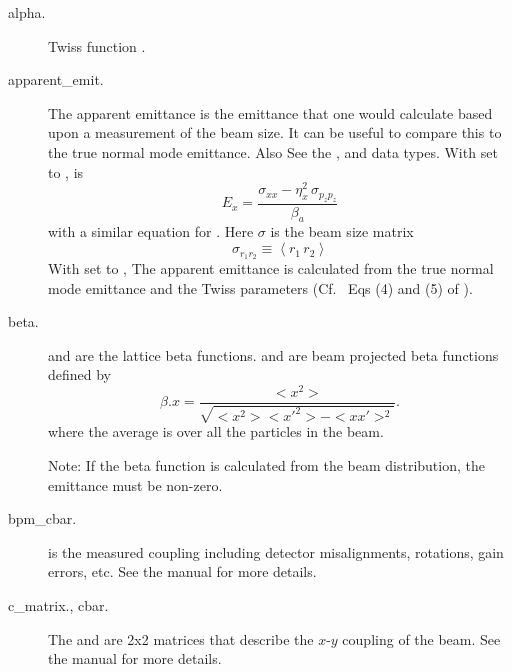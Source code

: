   \begin{description}

  \item[alpha.] \Newline
Twiss function .

  \item[apparent_emit.] \Newline
The apparent emittance is the emittance that one would calculate based
upon a measurement of the beam size\cite{b:emit}. It can be useful to
compare this to the true normal mode emittance. Also See the
,  and  data types.
With  set to ,  is
\begin{equation}
  E_x = \frac{\sigma_{xx} - \eta_x^2 \, \sigma_{p_zp_z}}{\beta_a}
\end{equation}
with a similar equation for . Here $\sigma$ is the beam size matrix
\begin{equation}
  \sigma_{r_1r_2} \equiv \left< r_1 \, r_2 \right>
\end{equation}
With  set to , The apparent emittance is
calculated from the true normal mode emittance and the Twiss
parameters (Cf.~ Eqs (4) and (5) of \cite{b:emit}).

  \item[beta.] \Newline
{} and  are the lattice beta functions.  and
 are beam projected beta functions defined by
\begin{equation}
  \beta.x = \frac{<x^{2}>}{\sqrt{<x^{2}> <x'^{2}> - <x x'>^{2}}}.
\end{equation}
where the average \vn{<>} is over all the particles in the beam.

Note: If the beta function is calculated from the beam distribution,
the emittance must be non-zero.

  \item[bpm_cbar.]
 is the measured coupling including detector misalignments, rotations, gain errors, etc.
See the \bmad manual for more details.

  \item[c_matrix., cbar.]
The  and  are 2x2 matrices that describe the $x$-$y$ coupling of the beam.
See the \bmad manual for more details.


\end{description}

